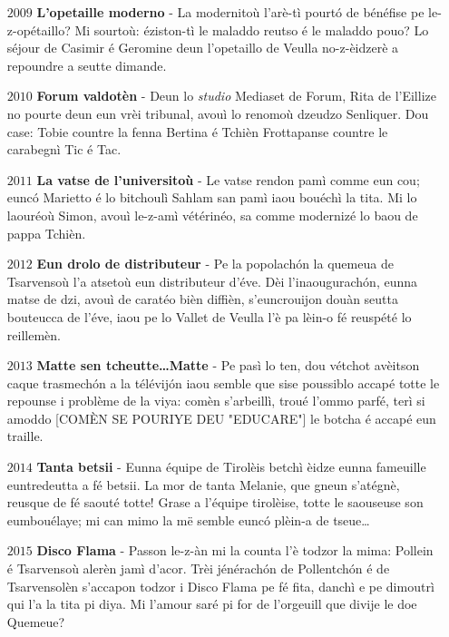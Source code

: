 \begin{center}
\begin{itemize}
\item[$2009$] \textbf{L'opetaille moderno} - La modernitoù l'arè-tì pourt\'o de bénéfise pe le-z-opétaillo? Mi sourtoù: éziston-tì le maladdo reutso é le maladdo pouo? Lo séjour de Casimir é Geromine deun l'opetaillo de Veulla no-z-èidzerè a repoundre a seutte dimande.\newline
\item[$2010$] \textbf{Forum valdotèn} - Deun lo \textit{studio} Mediaset de Forum, Rita de l'Eillize no pourte deun eun vrèi tribunal, avouì lo renomoù dzeudzo Senliquer. Dou case: Tobie countre la fenna Bertina é Tchièn Frottapanse countre le carabegnì Tic é Tac.\newline

\item[$2011$] \textbf{La vatse de l'universitoù} - Le vatse rendon pamì comme eun cou; eunc\'o Marietto é lo bitchoulì Sahlam san pamì iaou bouéchì la tita. Mi lo laouréoù Simon, avouì le-z-amì vétérinéo, sa comme modernizé lo baou de pappa Tchièn. \newline

\item[$2012$] \textbf{Eun drolo de distributeur} - Pe la popolach\'on la quemeua de Tsarvensoù l'a atsetoù  eun distributeur d'éve. Dèi l'inaougurach\'on, eunna matse de dzi, avouì de caratéo bièn diffièn, s'euncrouijon douàn seutta bouteucca de l'éve, iaou pe lo Vallet de Veulla l'è pa lèin-o fé reuspété lo reillemèn.
\newline

\item[$2013$] \textbf{Matte sen tcheutte\ldots Matte} - Pe pasì lo ten, dou vétchot avèitson caque trasmech\'on a la télévij\'on iaou semble que sise poussiblo accapé totte le repounse i problème de la viya: comèn s'arbeillì, troué l'ommo parfé, terì si amoddo [COMÈN SE POURIYE DEU "EDUCARE"] le botcha é accapé eun traille.\newline

\item[$2014$] \textbf{Tanta betsii} - Eunna équipe de Tirolèis betchì èidze eunna fameuille euntredeutta a fé betsii. La mor de tanta Melanie, que gneun s'atégnè, reusque de fé saouté totte! Grase a l'équipe tirolèise, totte le saouseuse son eumbouélaye; mi can mimo la më semble eunc\'o plèin-a de tseue\ldots\newline

\item[$2015$] \textbf{Disco Flama} - Passon le-z-àn mi la counta l'è todzor la mima: Pollein é Tsarvensoù alerèn jamì d'acor. Trèi jénérach\'on de Pollentch\'on é de Tsarvensolèn s'accapon todzor i Disco Flama pe fé fita, danchì e pe dimoutrì qui l'a la tita pi diya. Mi l'amour saré pi for de l'orgeuill que divije le doe Quemeue? \newline


\end{itemize}
\end{center}
